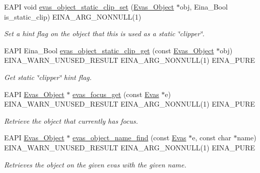 \begin{DoxyCompactItemize}
EAPI void \hyperlink{group__Evas__Object__Group__Extras_ga8697b24251c2209c60aabb1a5de860a8}{evas\_\-object\_\-static\_\-clip\_\-set} (\hyperlink{group__Evas__Object__Group_ga9e19e6dd1f517a0ba437c0114d3e7c97}{Evas\_\-Object} $\ast$obj, Eina\_\-Bool is\_\-static\_\-clip) EINA\_\-ARG\_\-NONNULL(1)
\begin{DoxyCompactList}\small\item\em Set a hint flag on the object that this is used as a static \char`\"{}clipper\char`\"{}. \item\end{DoxyCompactList}\item 
EAPI Eina\_\-Bool \hyperlink{group__Evas__Object__Group__Extras_gafda644be2d6e6360959853c9d6195ec8}{evas\_\-object\_\-static\_\-clip\_\-get} (const \hyperlink{group__Evas__Object__Group_ga9e19e6dd1f517a0ba437c0114d3e7c97}{Evas\_\-Object} $\ast$obj) EINA\_\-WARN\_\-UNUSED\_\-RESULT EINA\_\-ARG\_\-NONNULL(1) EINA\_\-PURE
\begin{DoxyCompactList}\small\item\em Get static \char`\"{}clipper\char`\"{} hint flag. \item\end{DoxyCompactList}\item 
EAPI \hyperlink{group__Evas__Object__Group_ga9e19e6dd1f517a0ba437c0114d3e7c97}{Evas\_\-Object} $\ast$ \hyperlink{group__Evas__Object__Group__Find_gaafc05ec22375400b9f0cfc8bcfc83bf5}{evas\_\-focus\_\-get} (const \hyperlink{group__Evas__Canvas_ga5ff87cc4ce6bc43e3b640a6d37f73043}{Evas} $\ast$e) EINA\_\-WARN\_\-UNUSED\_\-RESULT EINA\_\-ARG\_\-NONNULL(1) EINA\_\-PURE
\begin{DoxyCompactList}\small\item\em Retrieve the object that currently has focus. \item\end{DoxyCompactList}\item 
EAPI \hyperlink{group__Evas__Object__Group_ga9e19e6dd1f517a0ba437c0114d3e7c97}{Evas\_\-Object} $\ast$ \hyperlink{group__Evas__Object__Group__Find_gad3214c89581f068934c57ac71dc6a52f}{evas\_\-object\_\-name\_\-find} (const \hyperlink{group__Evas__Canvas_ga5ff87cc4ce6bc43e3b640a6d37f73043}{Evas} $\ast$e, const char $\ast$name) EINA\_\-WARN\_\-UNUSED\_\-RESULT EINA\_\-ARG\_\-NONNULL(1) EINA\_\-PURE
\begin{DoxyCompactList}\small\item\em Retrieves the object on the given evas with the given name. \item\end{DoxyCompactList}\item 

\end{DoxyCompactItemize}
